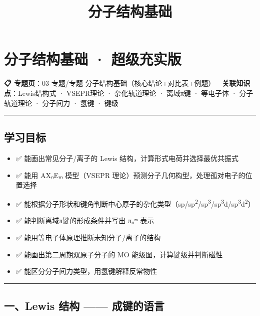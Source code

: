 \documentclass[a4paper,11pt]{ctexart}
\title{分子结构基础}
\date{}
\providecommand{\tightlist}{\setlength{\itemsep}{0pt}\setlength{\parskip}{0pt}}
\begin{document}
\maketitle
\tableofcontents
\newpage
\section{分子结构基础 · 超级充实版}\label{ux5206ux5b50ux7ed3ux6784ux57faux7840-ux8d85ux7ea7ux5145ux5b9eux7248}

\textbf{📋 专题页}：03-专题/专题-分子结构基础（核心结论+对比表+例题）
\textbf{🔗 关联知识点}：Lewis结构式 · VSEPR理论 · 杂化轨道理论 · 离域π键 · 等电子体 · 分子轨道理论 · 分子间力 · 氢键 · 键级

\begin{center}\rule{0.5\linewidth}{0.5pt}\end{center}

\subsection{学习目标}\label{ux5b66ux4e60ux76eeux6807}

\begin{itemize}
\tightlist
\item
  ✅ 能画出常见分子/离子的 Lewis 结构，计算形式电荷并选择最优共振式
\item
  ✅ 能用 AXₙEₘ 模型（VSEPR 理论）预测分子几何构型，处理孤对电子的位置选择
\item
  ✅ 能根据分子形状和键角判断中心原子的杂化类型（sp/sp\textsuperscript{2}/sp\textsuperscript{3}/sp\textsuperscript{3}d/sp\textsuperscript{3}d\textsuperscript{2}）
\item
  ✅ 能判断离域π键的形成条件并写出 πₙᵐ 表示
\item
  ✅ 能用等电子体原理推断未知分子/离子的结构
\item
  ✅ 能画出第二周期双原子分子的 MO 能级图，计算键级并判断磁性
\item
  ✅ 能区分分子间力类型，用氢键解释反常物性
\end{itemize}

\begin{center}\rule{0.5\linewidth}{0.5pt}\end{center}

\subsection{一、Lewis 结构 ------ 成键的语言}\label{ux4e00lewis-ux7ed3ux6784-ux6210ux952eux7684ux8bedux8a00}
\end{document}
